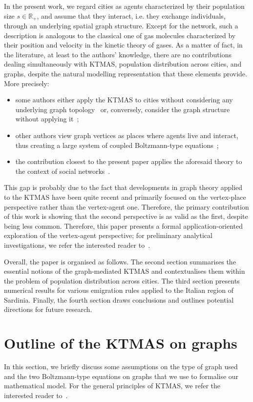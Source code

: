 \documentclass[a4paper]{article}
\newcommand{\R}{\mathbb{R}}
\begin{document}
In the present work, we regard cities as agents characterized by their population size $s\in\R_+$, and assume that they interact, i.e. they exchange individuals, through an underlying spatial graph structure. Except for the network, such a description is analogous to the classical one of gas molecules characterized by their position and velocity in the kinetic theory of gases. As a matter of fact, in the literature, at least to the authors' knowledge, there are no contributions dealing simultaneously with KTMAS, population distribution across cities, and graphs, despite the natural modelling representation that these elements provide. More precisely:
\begin{itemize}
\item some authors either apply the KTMAS to cities without considering any underlying graph topology~\cite{Gualandi2019SDC} or, conversely, consider the graph structure without applying it~\cite{Berliant2018};
\item other authors view graph vertices as places where agents live and interact, thus creating a large system of coupled Boltzmann-type equations~\cite{Loy2021};
\item the contribution closest to the present paper applies the aforesaid theory to the context of social networks~\cite{Nurisso2024}.
\end{itemize}

This gap is probably due to the fact that developments in graph theory applied to the KTMAS have been quite recent and primarily focused on the vertex-place perspective rather than the vertex-agent one. Therefore, the primary contribution of this work is showing that the second perspective is as valid as the first, despite being less common. Therefore, this paper presents a formal application-oriented exploration of the vertex-agent perspective; for preliminary analytical investigations, we refer the interested reader to~\cite{taricco2026PREPRINT}.

Overall, the paper is organised as follows. The second section summarises the essential notions of the graph-mediated KTMAS and contextualises them within the problem of population distribution across cities. The third section presents numerical results for various emigration rules applied to the Italian region of Sardinia. Finally, the fourth section draws conclusions and outlines potential directions for future research.

\section{Outline of the KTMAS on graphs}
\label{secNotesKTMAS}
%
In this section, we briefly discuss some assumptions on the type of graph used and the two Boltzmann-type equations on graphs that we use to formalise our mathematical model. For the general principles of KTMAS, we refer the interested reader to~\cite{Loy2025EKTMAS,PareschiIMS2013}.
\end{document}
